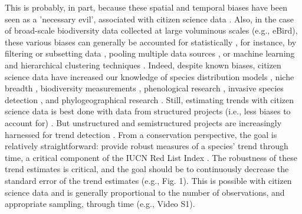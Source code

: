 \documentclass[9pt,twocolumn,twoside,lineno]{pnas-new}
\begin{document}
This is probably, in part, because these spatial and temporal biases have been seen as a 'necessary evil', associated with citizen science data \cite{parrish2018exposing}. Also, in the case of broad-scale biodiversity data collected at large voluminous scales (e.g., eBird), these various biases can generally be accounted for statistically \cite{isaac2014statistics, robinson2018correcting}, for instance, by filtering or subsetting data \cite{wiggins2011conservation}, pooling multiple data sources \cite{fithian2015bias}, or machine learning and hierarchical clustering techniques \cite{hochachka2012data, kelling2015taking}. Indeed, despite known biases, citizen science data have increased our knowledge of species distribution models \cite{bradsworth2017species, van2013opportunistic}, niche breadth \cite{tiago2017using}, biodiversity measurements \cite{stuart2017assessing, pocock2018vision}, phenological research \cite{la2014role, supp2015citizen}, invasive species detection \cite{pocock2017citizen, grason2018citizen}, and phylogeographical research \cite{bahls2014new, drury2019continent}. Still, estimating trends with citizen science data is best done with data from structured projects (i.e., less biases to account for) \cite{fox2011new}. But unstructured and semistructured projects are increasingly harnessed for trend detection \cite{walker2017using, kery2009trend, kery2010site, horns2018using, van2013occupancy, pagel2014quantifying}. From a conservation perspective, the goal is relatively straightforward: provide robust measures of a species' trend through time, a critical component of the IUCN Red List Index \cite{baillie2008toward}. The robustness of these trend estimates is critical, and the goal should be to continuously decrease the standard error of the trend estimates (e.g., Fig. 1). This is possible with citizen science data \cite{kery2010site, horns2018using, van2013occupancy, pagel2014quantifying} and is generally proportional to the number of observations, and appropriate sampling, through time (e.g., Video S1).
\end{document}
